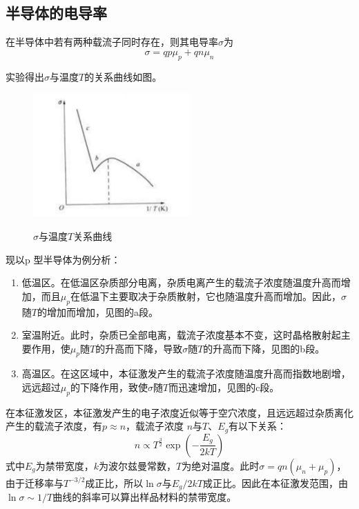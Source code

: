 \documentclass[a4paper]{article}
\begin{document}
\subsection{半导体的电导率}
在半导体中若有两种载流子同时存在，则其电导率$\sigma$为
\begin{equation}\label{6.1.15}
\sigma=qp\mu_p+qn\mu_n
\end{equation}

实验得出$\sigma$与温度$T$的关系曲线如图。
\begin{figure}[!h]
	\centering
	\includegraphics[width=6cm]{fig/fig3.png}\\
	\caption{$\sigma$与温度$T$关系曲线}\label{fig3}
\end{figure}

现以p 型半导体为例分析：
\begin{enumerate}
\item 低温区。在低温区杂质部分电离，杂质电离产生的载流子浓度随温度升高而增加，而且$\mu_p$在低温下主要取决于杂质散射，它也随温度升高而增加。因此，$\sigma$随$T$的增加而增加，见图的a段。
\item 室温附近。此时，杂质已全部电离，载流子浓度基本不变，这时晶格散射起主要作用，使$\mu_p$随$T$的升高而下降，导致$\sigma$随$T$的升高而下降，见图的b段。
\item 高温区。在这区域中，本征激发产生的载流子浓度随温度升高而指数地剧增，远远超过$\mu_p$的下降作用，致使$\sigma$随$T$而迅速增加，见图的c段。
\end{enumerate}

在本征激发区，本征激发产生的电子浓度近似等于空穴浓度，且远远超过杂质离化产生的载流子浓度，有$p\approx n$，载流子浓度 $n$与$T$、$E_g$有以下关系：
\begin{equation*}
n\propto T^{\frac{3}{2}} \exp(-\frac{E_g}{2kT})
\end{equation*}
式中$E_g$为禁带宽度，$k$为波尔兹曼常数，$T$为绝对温度。此时$\sigma=qn(\mu_n+\mu_p)$，由于迁移率与$T^{-3/2}$成正比，所以$\ln\sigma$与$E_g/2kT$成正比。因此在本征激发范围，由$\ln\sigma \sim 1/T$曲线的斜率可以算出样品材料的禁带宽度。
\end{document}
